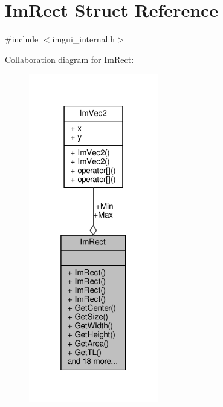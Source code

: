 \hypertarget{structImRect}{}\section{Im\+Rect Struct Reference}
\label{structImRect}


{\ttfamily \#include $<$imgui\+\_\+internal.\+h$>$}



Collaboration diagram for Im\+Rect\+:
\nopagebreak
\begin{figure}[H]
\begin{center}
\leavevmode
\includegraphics[width=160pt]{structImRect__coll__graph}
\end{center}
\end{figure}
